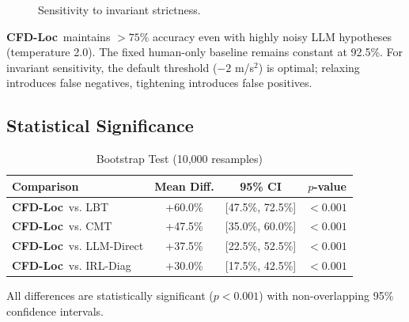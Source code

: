 \documentclass[conference]{IEEEtran}
\theoremstyle{plain}
\newcommand{\methodname}{\textbf{CFD-Loc}}
\begin{document}
\begin{figure}[h]
\centering
{}
\caption{Sensitivity to invariant strictness.}
\label{fig:inv_sensitivity}
\end{figure}

\noindent \methodname\ maintains $>75\%$ accuracy even with highly noisy LLM hypotheses (temperature 2.0). The fixed human-only baseline remains constant at 92.5\%. For invariant sensitivity, the default threshold ($-2$ m/s$^2$) is optimal; relaxing introduces false negatives, tightening introduces false positives.

\subsection{Statistical Significance}
\begin{table}[h]
\centering
\caption{Bootstrap Test (10,000 resamples)}
\label{tab:stats}
\begin{tabular}{lccc}
\toprule
\textbf{Comparison} & \textbf{Mean Diff.} & \textbf{95\% CI} & \textbf{$p$-value}\\\midrule
\methodname\ vs. LBT & +60.0\% & [47.5\%, 72.5\%] & $<0.001$\\
\methodname\ vs. CMT & +47.5\% & [35.0\%, 60.0\%] & $<0.001$\\
\methodname\ vs. LLM-Direct & +37.5\% & [22.5\%, 52.5\%] & $<0.001$\\
\methodname\ vs. IRL-Diag & +30.0\% & [17.5\%, 42.5\%] & $<0.001$\\
\bottomrule
\end{tabular}
\end{table}

All differences are statistically significant ($p < 0.001$) with non-overlapping 95\% confidence intervals.
\end{document}
